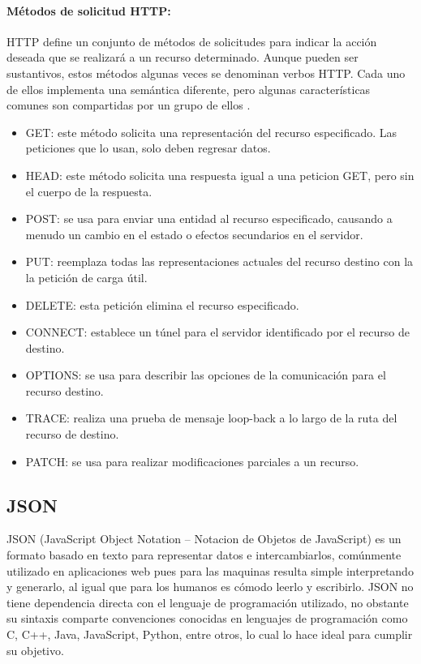 \paragraph{Métodos de solicitud HTTP:}

HTTP define un conjunto de métodos de solicitudes para indicar la acción deseada que se realizará a un recurso determinado. Aunque pueden ser sustantivos, estos métodos algunas veces se denominan verbos HTTP. Cada uno de ellos implementa una semántica diferente, pero algunas características comunes son compartidas por un grupo de ellos \cite{HTTPM}.\\

\begin{itemize}
	\item GET: este método solicita una representación del recurso especificado. Las peticiones que lo usan, solo deben regresar datos.
	\item HEAD: este método solicita una respuesta igual a una peticion GET, pero sin el cuerpo de la respuesta.
	\item POST: se usa para enviar una entidad al recurso especificado, causando a menudo un cambio en el estado o efectos secundarios en el servidor.
	\item PUT: reemplaza todas las representaciones actuales del recurso destino con la la petición de carga útil.
	\item DELETE: esta petición elimina el recurso especificado.
	\item CONNECT: establece un túnel para el servidor identificado por el recurso de destino.
	\item OPTIONS: se usa para describir las opciones de la comunicación para el recurso destino.
	\item TRACE: realiza una prueba de mensaje loop-back a lo largo de la ruta del recurso de destino. 
	\item PATCH: se usa para realizar modificaciones parciales a un recurso.
\end{itemize}

\subsection{JSON}

JSON (JavaScript Object Notation – Notacion de Objetos de JavaScript) es un formato basado en texto para representar datos e intercambiarlos, comúnmente utilizado en aplicaciones web pues para las maquinas resulta simple interpretando y generarlo, al igual que para los humanos es cómodo leerlo y escribirlo. JSON no tiene dependencia directa con el lenguaje de programación utilizado, no obstante su sintaxis comparte convenciones conocidas en  lenguajes de programación como C, C++, Java, JavaScript, Python, entre otros, lo cual lo hace ideal para cumplir su objetivo.\cite{JSON}\\

